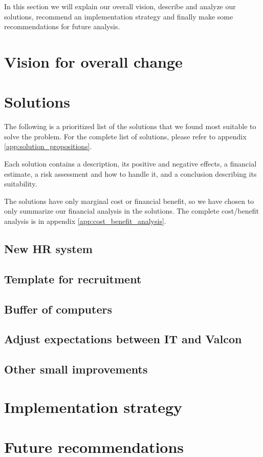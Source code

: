 In this section we will explain our overall vision, describe and analyze our solutions, recommend an implementation strategy and finally make some recommendations for future analysis.

\section{Vision for overall change}


\section{Solutions}
The following is a prioritized list of the solutions that we found most suitable to solve the problem.
For the complete list of solutions, please refer to appendix \ref{app:solution_propositions}.

Each solution contains a description, its positive and negative effects, a financial estimate, a risk assessment and how to handle it, and a conclusion describing its suitability.

The solutions have only marginal cost or financial benefit, so we have chosen to only summarize our financial analysis in the solutions.
The complete cost/benefit analysis is in appendix \ref{app:cost_benefit_analysis}.

\subsection{New HR system}

	
\subsection{Template for recruitment}


\subsection{Buffer of computers}


\subsection{Adjust expectations between IT and Valcon}


\subsection{Other small improvements}


\section{Implementation strategy}


\section{Future recommendations}
